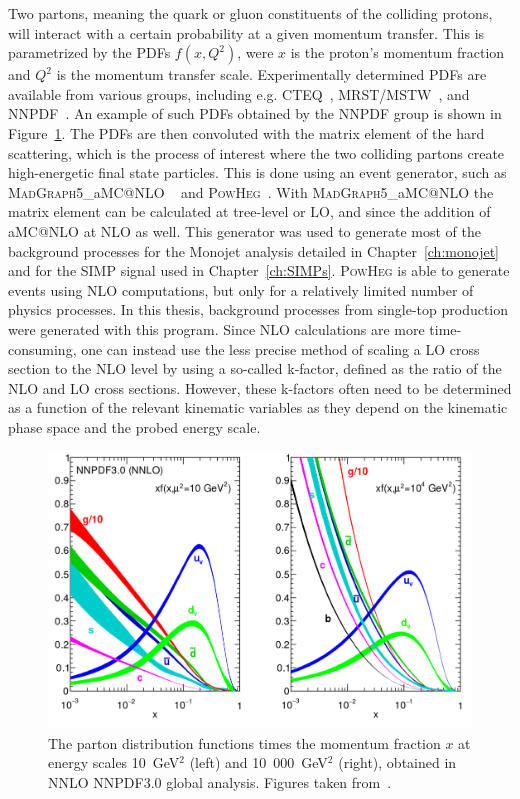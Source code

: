 Two partons, meaning the quark or gluon constituents of the colliding protons, will interact with a certain probability at a given momentum transfer. This is parametrized by the \acp{PDF} $f(x, Q^2)$, were $x$ is the proton's momentum fraction and $Q^2$ is the momentum transfer scale. Experimentally determined \acp{PDF} are available from various groups, including e.g. CTEQ~\cite{Pumplin:2002vw}, MRST/MSTW~\cite{Martin:2009iq}, and NNPDF~\cite{Ball:2014uwa}. An example of such \acp{PDF} obtained by the NNPDF group is shown in Figure~\ref{fig:pdf}. The \acp{PDF} are then convoluted with the matrix element of the hard scattering, which is the process of interest where the two colliding partons create high-energetic final state particles. This is done using an event generator, such as \textsc{MadGraph5\_}a\textsc{MC@NLO} ~\cite{Alwall:2014hca} and \textsc{PowHeg}~\cite{Frixione:2007vw}. With \textsc{MadGraph5\_}a\textsc{MC@NLO} the matrix element can be calculated at tree-level or \ac{LO}, and since the addition of a\textsc{MC@NLO} at \ac{NLO} as well. This generator was used to generate most of the background processes for the Monojet analysis detailed in Chapter~\ref{ch:monojet} and for the \ac{SIMP} signal used in Chapter~\ref{ch:SIMPs}. \textsc{PowHeg} is able to generate events using \ac{NLO} computations, but only for a relatively limited number of physics processes. In this thesis, background processes from single-top production were generated with this program. Since \ac{NLO} calculations are more time-consuming, one can instead use the less precise method of scaling a \ac{LO} cross section to the \ac{NLO} level by using a so-called k-factor, defined as the ratio of the \ac{NLO} and \ac{LO} cross sections. However, these k-factors often need to be determined as a function of the relevant kinematic variables as they depend on the kinematic phase space and the probed energy scale.

\begin{figure}[ht]
  \centering
 \includegraphics[width=.75\textwidth]{pdf.png} 
 \caption{The parton distribution functions times the momentum fraction $x$ at energy scales 10~GeV$^2$ (left) and 10~000~GeV$^2$ (right), obtained in NNLO NNPDF3.0 global analysis. Figures taken from~\cite{Ball:2014uwa}.}
 \label{fig:pdf}
\end{figure}

